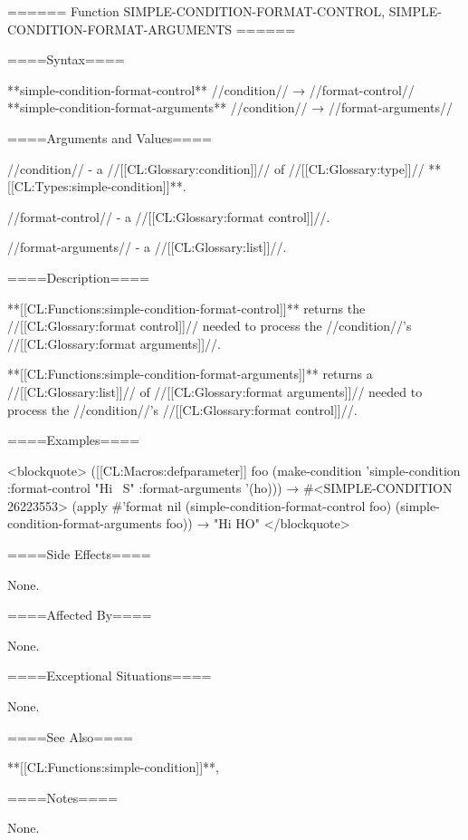 ====== Function SIMPLE-CONDITION-FORMAT-CONTROL, SIMPLE-CONDITION-FORMAT-ARGUMENTS ======

====Syntax====

**simple-condition-format-control** //condition// → //format-control// **simple-condition-format-arguments** //condition// → //format-arguments//

====Arguments and Values====

//condition// - a //[[CL:Glossary:condition]]// of //[[CL:Glossary:type]]// **[[CL:Types:simple-condition]]**.

//format-control// - a //[[CL:Glossary:format control]]//.

//format-arguments// - a //[[CL:Glossary:list]]//.

====Description====

**[[CL:Functions:simple-condition-format-control]]** returns the //[[CL:Glossary:format control]]// needed to process the //condition//'s //[[CL:Glossary:format arguments]]//.

**[[CL:Functions:simple-condition-format-arguments]]** returns a //[[CL:Glossary:list]]// of //[[CL:Glossary:format arguments]]// needed to process the //condition//'s //[[CL:Glossary:format control]]//.

====Examples====

<blockquote> ([[CL:Macros:defparameter]] foo (make-condition 'simple-condition :format-control "Hi ~S" :format-arguments '(ho))) → #<SIMPLE-CONDITION 26223553> (apply #'format nil (simple-condition-format-control foo) (simple-condition-format-arguments foo)) → "Hi HO" </blockquote>

====Side Effects====

None.

====Affected By====

None.

====Exceptional Situations====

None.

====See Also====

**[[CL:Functions:simple-condition]]**, {\secref\ConditionSystemConcepts}

====Notes====

None.

